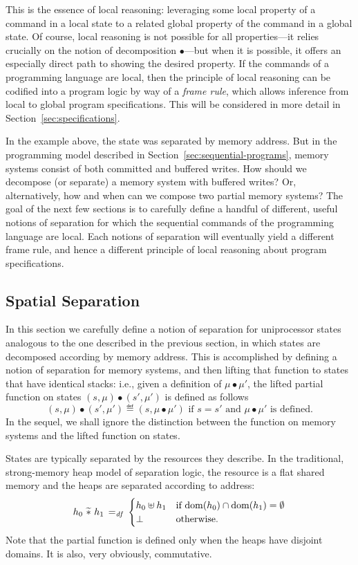\documentclass[11pt]{report}
\begin{document}
This is the essence of local reasoning: leveraging some local property of a command in a local state to a related global property of the command in a global state. Of course, local reasoning is not possible for all properties---it relies crucially on the notion of decomposition $\bullet$---but when it is possible, it offers an especially direct path to showing the desired property. If the commands of a programming language are local, then the principle of local reasoning can be codified into a program logic by way of a \emph{frame rule}, which allows inference from local to global program specifications. This will be considered in more detail in Section~\ref{sec:specifications}. 

In the example above, the state was separated by memory address. But in the programming model described in Section~\ref{sec:sequential-programs}, memory systems consist of both committed and buffered writes. How should we decompose (or separate) a memory system with buffered writes? Or, alternatively, how and when can we compose two partial memory systems? The goal of the next few sections is to carefully define a handful of different, useful notions of separation for which the sequential commands of the programming language are local. Each notions of separation will eventually yield a different frame rule, and hence a different principle of local reasoning about program specifications. 

\subsection{Spatial Separation}
\label{sec:sequential-spatial-separation}

In this section we carefully define a notion of separation for uniprocessor states analogous to the one described in the previous section, in which states are decomposed according by memory address. This is accomplished by defining a notion of separation for memory systems, and then lifting that function to states that have identical stacks: i.e., given a definition of $\mu \bullet \mu'$, the lifted partial function on states $(s,\mu) \bullet (s',\mu')$ is defined as follows \[ (s,\mu) \bullet (s',\mu') \eqdef (s,\mu \bullet \mu') \text{~if $s = s'$ and $\mu \bullet \mu'$ is defined.}\] In the sequel, we shall ignore the distinction between the function on memory systems and the lifted function on states. 

States are typically separated by the resources they describe. In the traditional, strong-memory heap model of separation logic, the resource is a flat shared memory and the heaps are separated according to address: \[ h_0 \operatorname{\,\widetilde{\ast}\,} h_1 \operatorname{\;=_{\mathit{df}}\;} \begin{cases}
    h_0 \uplus h_1 & \text{if $\operatorname{\mathrm{dom}}(h_0) \cap \operatorname{\mathrm{dom}}(h_1) = \operatorname{\emptyset}$} \\ 
    \bot & \text{otherwise.}
\end{cases}\] Note that the partial function is defined only when the heaps have disjoint domains. It is also, very obviously, commutative. 
\end{document}
